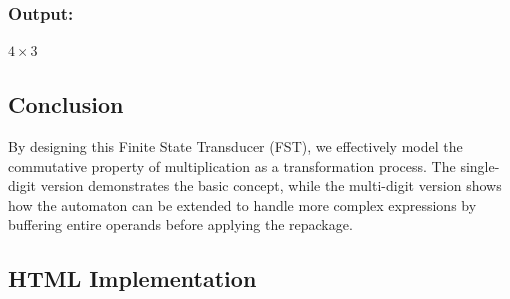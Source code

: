\documentclass[11pt]{article}
\begin{document}
\subsubsection*{Output:} \( 4 \times 3 \)
\subsection*{Conclusion}

By designing this Finite State Transducer (FST), we effectively model the commutative property of multiplication as a transformation process. The single-digit version demonstrates the basic concept, while the multi-digit version shows how the automaton can be extended to handle more complex expressions by buffering entire operands before applying the repackage.

\subsection*{HTML Implementation}


\clearpage

\printbibliography
\end{document}
